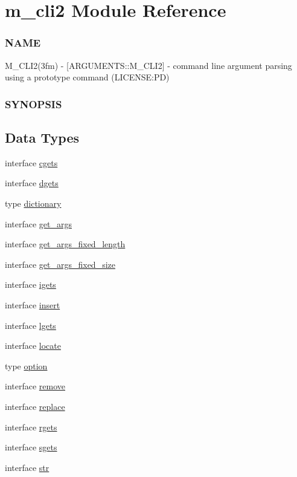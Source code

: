 \hypertarget{namespacem__cli2}{}\section{m\+\_\+cli2 Module Reference}
\label{namespacem__cli2}


\subsubsection*{N\+A\+ME}

M\+\_\+\+C\+L\+I2(3fm) -\/ \mbox{[}A\+R\+G\+U\+M\+E\+N\+T\+S\+::\+M\+\_\+\+C\+L\+I2\mbox{]} -\/ command line argument parsing using a prototype command (L\+I\+C\+E\+N\+SE\+:PD) \subsubsection*{S\+Y\+N\+O\+P\+S\+IS} 


\subsection*{Data Types}
\begin{DoxyCompactItemize}
\item 
interface \mbox{\hyperlink{interfacem__cli2_1_1cgets}{cgets}}
\item 
interface \mbox{\hyperlink{interfacem__cli2_1_1dgets}{dgets}}
\item 
type \mbox{\hyperlink{structm__cli2_1_1dictionary}{dictionary}}
\item 
interface \mbox{\hyperlink{interfacem__cli2_1_1get__args}{get\+\_\+args}}
\item 
interface \mbox{\hyperlink{interfacem__cli2_1_1get__args__fixed__length}{get\+\_\+args\+\_\+fixed\+\_\+length}}
\item 
interface \mbox{\hyperlink{interfacem__cli2_1_1get__args__fixed__size}{get\+\_\+args\+\_\+fixed\+\_\+size}}
\item 
interface \mbox{\hyperlink{interfacem__cli2_1_1igets}{igets}}
\item 
interface \mbox{\hyperlink{interfacem__cli2_1_1insert}{insert}}
\item 
interface \mbox{\hyperlink{interfacem__cli2_1_1lgets}{lgets}}
\item 
interface \mbox{\hyperlink{interfacem__cli2_1_1locate}{locate}}
\item 
type \mbox{\hyperlink{structm__cli2_1_1option}{option}}
\item 
interface \mbox{\hyperlink{interfacem__cli2_1_1remove}{remove}}
\item 
interface \mbox{\hyperlink{interfacem__cli2_1_1replace}{replace}}
\item 
interface \mbox{\hyperlink{interfacem__cli2_1_1rgets}{rgets}}
\item 
interface \mbox{\hyperlink{interfacem__cli2_1_1sgets}{sgets}}
\item 
interface \mbox{\hyperlink{interfacem__cli2_1_1str}{str}}
\end{DoxyCompactItemize}
